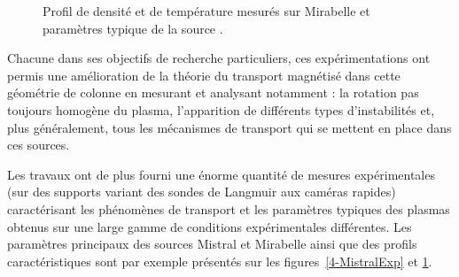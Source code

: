 \begin{refsection}
\begin{figure}[!htbp] 
  \centering
    \caption{Profil de densité et de température mesurés sur Mirabelle et
    paramètres typique de la source \parencite{Bousselin}.}
    \label{4-MirabelleExp}
\end{figure}

Chacune dans ses objectifs de recherche particuliers, ces expérimentations
ont permis une amélioration de la théorie du transport magnétisé dans cette
géométrie de colonne en mesurant et analysant notamment : la rotation pas
toujours homogène du plasma, l'apparition de différents types
d'instabilités et, plus généralement, tous les mécanismes de transport qui se mettent en place dans ces sources.

Les travaux ont de plus fourni une énorme quantité de mesures
expérimentales (sur des supports variant des sondes de Langmuir aux caméras
rapides) caractérisant les phénomènes de transport et les paramètres typiques
des plasmas obtenus sur une large gamme de conditions expérimentales
différentes.  Les paramètres principaux des sources Mistral et Mirabelle ainsi que des profils
caractéristiques sont par exemple présentés sur les
figures~\ref{4-MistralExp} et \ref{4-MirabelleExp}.


\end{refsection}
